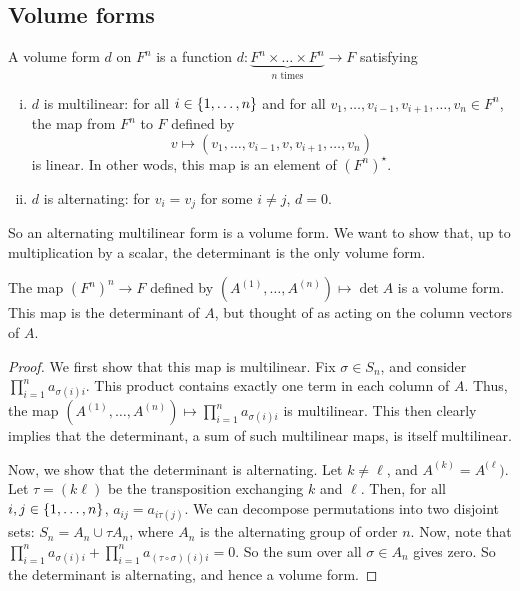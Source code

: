 \subsection{Volume forms}
\begin{definition}
	A volume form \( d \) on \( F^n \) is a function \( d \colon \underbrace{F^n \times \dots \times F^n}_{n \text{ times}} \to F \) satisfying
	\begin{enumerate}[(i)]
		\item \( d \) is multilinear: for all \( i \in \qty{1, \dots, n} \) and for all \( v_1, \dots, v_{i-1}, v_{i+1}, \dots, v_n \in F^n \), the map from \( F^n \) to \( F \) defined by
		      \[
			      v \mapsto (v_1, \dots, v_{i-1}, v, v_{i+1}, \dots, v_n)
		      \]
		      is linear.
		      In other wods, this map is an element of \( (F^n)^\star \).
		\item \( d \) is alternating: for \( v_i = v_j \) for some \( i \neq j \), \( d = 0 \).
	\end{enumerate}
	So an alternating multilinear form is a volume form.
	We want to show that, up to multiplication by a scalar, the determinant is the only volume form.
\end{definition}
\begin{lemma}
	The map \( (F^n)^n \to F \) defined by \( (A^{(1)}, \dots, A^{(n)}) \mapsto \det A \) is a volume form.
	This map is the determinant of \( A \), but thought of as acting on the column vectors of \( A \).
\end{lemma}
\begin{proof}
	We first show that this map is multilinear.
	Fix \( \sigma \in S_n \), and consider \( \prod_{i=1}^n a_{\sigma(i) i} \).
	This product contains exactly one term in each column of \( A \).
	Thus, the map \( (A^{(1)}, \dots, A^{(n)}) \mapsto \prod_{i=1}^n a_{\sigma(i) i} \) is multilinear.
	This then clearly implies that the determinant, a sum of such multilinear maps, is itself multilinear.

	Now, we show that the determinant is alternating.
	Let \( k \neq \ell \), and \( A^{(k)} = A^{(\ell}) \).
	Let \( \tau = ( k \ell ) \) be the transposition exchanging \( k \) and \( \ell \).
	Then, for all \( i, j \in \qty{1, \dots, n} \), \( a_{ij} = a_{i \tau(j)} \).
	We can decompose permutations into two disjoint sets: \( S_n = A_n \cup \tau A_n \), where \( A_n \) is the alternating group of order \( n \).
	Now, note that \( \prod_{i=1}^n a_{\sigma(i) i} + \prod_{i=1}^n a_{(\tau \circ \sigma)(i) i} = 0 \).
	So the sum over all \( \sigma \in A_n \) gives zero.
	So the determinant is alternating, and hence a volume form.
\end{proof}
